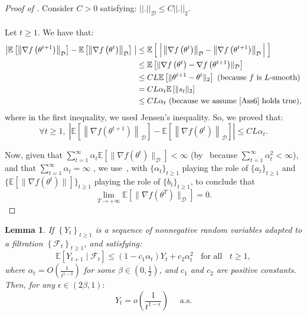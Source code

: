 \documentclass{article} %
\newtheorem{lemma}{Lemma}
\begin{document}
\begin{proof}[Proof of ]
Consider $C > 0$ satisfying: $
||.||_{\mathcal{D} } \le C ||.||_2$.\\\\
Let $t\ge 1$. We have that:
\begin{align*}
    \left| \mathbb{E}\left[ \left\|\nabla f\left(\theta^{t+1}\right)\right\|_{\mathcal{D}}\right]-\mathbb{E}\left[\left\|\nabla f\left(\theta^t\right)\right\|_{\mathcal{D}}\right] \;\right|  
    &\le
   \mathbb{E}\left[ \; \Big|  \left\|\nabla f\left(\theta^t\right)\right\|_{\mathcal{D}}-  \left\|\nabla f\left(\theta^{t+1}\right)\right\|_{\mathcal{D}}  \Big| \;\right]  
    \\
     &\le
   \mathbb{E}\left[ \lVert \nabla f\left(\theta^{t}\right)-\nabla f\left(\theta^{t+1}\right)  \rVert_{\mathcal{D}} \right]\\
    &\le CL \mathbb{E}\left[ 
  \lVert\theta^{t+1}-\theta^t\rVert_2 \right] \text{ (because } f \text{ is } L\text{-smooth)}
  \\ &= CL \alpha_t \mathbb{E}\left[ \lVert s_t \rVert_2 \right]
  \\ &\le CL \alpha_t  \text{  (because we assume~\Cref{Ass6} holds true)},
\end{align*}
where in the first inequality, we used Jensen's inequality. So, we proved that:
$$\forall t \ge 1,\; 
 \left| \mathbb{E}[\left\|\nabla f\left(\theta^{t+1}\right)\right\|_{\mathcal{D}}]-\mathbb{E}[\left\|\nabla f\left(\theta^t\right)\right\|_{\mathcal{D}}]\right|  \le CL \alpha_t .$$


Now, given that
$\sum_{t=1}^{\infty} \alpha_t   \mathbb{E}[ \lVert \nabla f(\theta^t) \rVert_{\mathcal{D}}] <\infty$  (by~ because $\sum_{t=1}^{ \infty} \alpha_t^2 <\infty$), and that
$\sum_{t=1}^{\infty} \alpha_t=\infty$ , we use~, with $\{\alpha_t\}_{t\ge 1}$ playing the role of $\{a_t\}_{t\ge 1}$ and $\{\mathbb{E}[\lVert \nabla f(\theta^t) \rVert]\}_{t\ge 1}$ playing the role of $\{b_t\}_{t\ge 1}$, to conclude that
$$\lim\limits_{T \rightarrow +\infty} \mathbb{E}[ \lVert \nabla f(\theta^T) \rVert_{\mathcal{D}}]=0.$$
\end{proof}



\begin{lemma}\label{Lemma4}\textbf{\cite[Lemma 1]{liu2022almost} }
 If $\left\{Y_t\right\}_{t \ge 1}$ is a sequence of nonnegative random variables adapted to a filtration $\left\{\mathcal{F}_t\right\}_{t \ge 1}$, and satisfying:
$$
\mathbb{E}\left[Y_{t+1} \mid \mathcal{F}_t\right] \leq\left(1-c_1 \alpha_t\right) Y_t+c_2 \alpha_t^2\;\; \text{ for all } \;\;t \geq 1 ,
$$
where $\alpha_t=O\left(\frac{1}{t^{1-\beta}}\right)$ for some $\beta \in\left(0, \frac{1}{2}\right)$, and $c_1$ and $c_2$ are positive constants. Then, for any $\epsilon \in(2 \beta, 1):$
$$
Y_t=o\left(\frac{1}{t^{1-\epsilon}}\right) \quad \text { a.s.} 
$$
\end{lemma}
\end{document}
